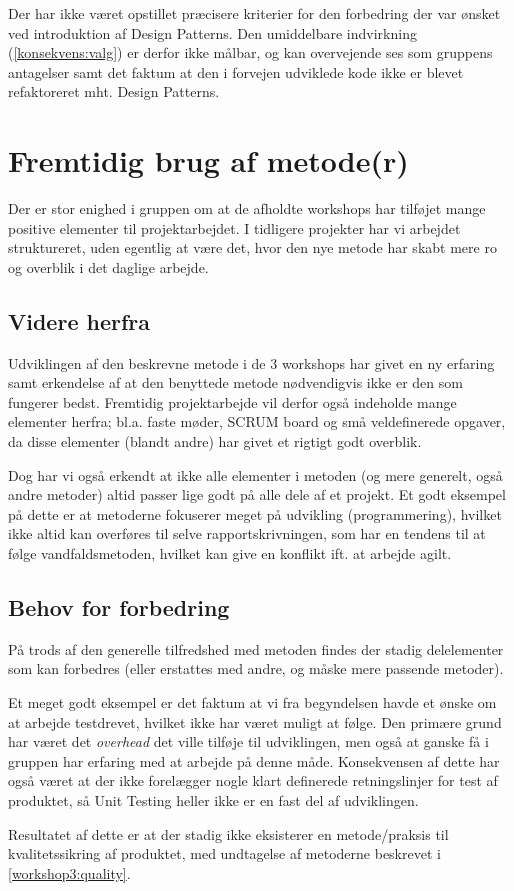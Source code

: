 Der har ikke været opstillet præcisere kriterier for den forbedring der var ønsket ved introduktion af Design Patterns.
Den umiddelbare indvirkning (\cref{konsekvens:valg}) er derfor ikke målbar, og kan overvejende ses som gruppens antagelser samt det faktum at den i forvejen udviklede kode ikke er blevet refaktoreret mht. Design Patterns.

\section{Fremtidig brug af metode(r)}\label{workshop3:fremtidig_brug}
Der er stor enighed i gruppen om at de afholdte workshops har tilføjet mange positive elementer til projektarbejdet.
I tidligere projekter har vi arbejdet struktureret, uden egentlig at være det, hvor den nye metode har skabt mere ro og overblik i det daglige arbejde.

\subsection{Videre herfra}
Udviklingen af den beskrevne metode i de 3 workshops har givet en ny erfaring samt erkendelse af at den benyttede metode nødvendigvis ikke er den som fungerer bedst.
Fremtidig projektarbejde vil derfor også indeholde mange elementer herfra; bl.a. faste møder, SCRUM board og små veldefinerede opgaver, da disse elementer (blandt andre) har givet et rigtigt godt overblik.

Dog har vi også erkendt at ikke alle elementer i metoden (og mere generelt, også andre metoder) altid passer lige godt på alle dele af et projekt.
Et godt eksempel på dette er at metoderne fokuserer meget på udvikling (programmering), hvilket ikke altid kan overføres til selve rapportskrivningen, som har en tendens til at følge vandfaldsmetoden, hvilket kan give en konflikt ift. at arbejde agilt.

\subsection{Behov for forbedring}
På trods af den generelle tilfredshed med metoden findes der stadig delelementer som kan forbedres (eller erstattes med andre, og måske mere passende metoder).

Et meget godt eksempel er det faktum at vi fra begyndelsen havde et ønske om at arbejde testdrevet, hvilket ikke har været muligt at følge.
Den primære grund har været det \textit{overhead} det ville tilføje til udviklingen, men også at ganske få i gruppen har erfaring med at arbejde på denne måde.
Konsekvensen af dette har også været at der ikke forelægger nogle klart definerede retningslinjer for test af produktet, så Unit Testing heller ikke er en fast del af udviklingen.

Resultatet af dette er at der stadig ikke eksisterer en metode/praksis til kvalitetssikring af produktet, med undtagelse af metoderne beskrevet i \cref{workshop3:quality}.